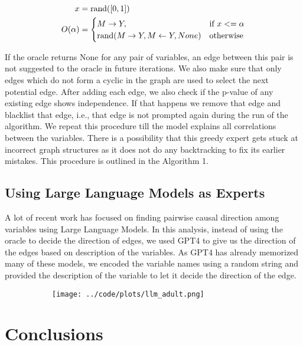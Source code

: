 \documentclass[letterpaper]{article} %
\begin{document}
\begin{equation}
	\begin{split}
		x &= \textnormal{rand}([0, 1]) \\
		O(\alpha) &= \begin{cases} 
			M \rightarrow Y, & \textnormal{if  } x <= \alpha \\
			\textnormal{rand}(M \rightarrow Y, M \leftarrow Y, None) & \textnormal{otherwise} \\
				\end{cases} \\
	\end{split}
\end{equation}

If the oracle returns None for any pair of variables, an edge between this pair
is not suggested to the oracle in future iterations. We also make sure that
only edges which do not form a cyclic in the graph are used to select the next
potential edge. After adding each edge, we also check if the p-value of any
existing edge shows independence. If that happens we remove that edge and
blacklist that edge, i.e., that edge is not prompted again during the run of
the algorithm. We repeat this procedure till the model explains all
correlations between the variables. There is a possibility that this greedy
expert gets stuck at incorrect graph structures as it does not do any
backtracking to fix its earlier mistakes. This procedure is outlined in the
Algorithm 1.

\subsection{Using Large Language Models as Experts}
A lot of recent work has focused on finding pairwise causal direction among
variables using Large Language Models. In this analysis, instead of using the
oracle to decide the direction of edges, we used GPT4 to give us the direction
of the edges based on description of the variables. As GPT4 has already
memorized many of these models, we encoded the variable names using a random
string and provided the description of the variable to let it decide the
direction of the edge.

\begin{figure}
	\centering
	\begin{subfigure}{0.5\textwidth}
		\caption{}
	\end{subfigure}
	\begin{subfigure}{0.5\textwidth}
		\centering
		\texttt{[image: ../code/plots/llm\_adult.png]}
		\caption{}
	\end{subfigure}
\end{figure}

\section{Conclusions}

\newpage

\end{document}
